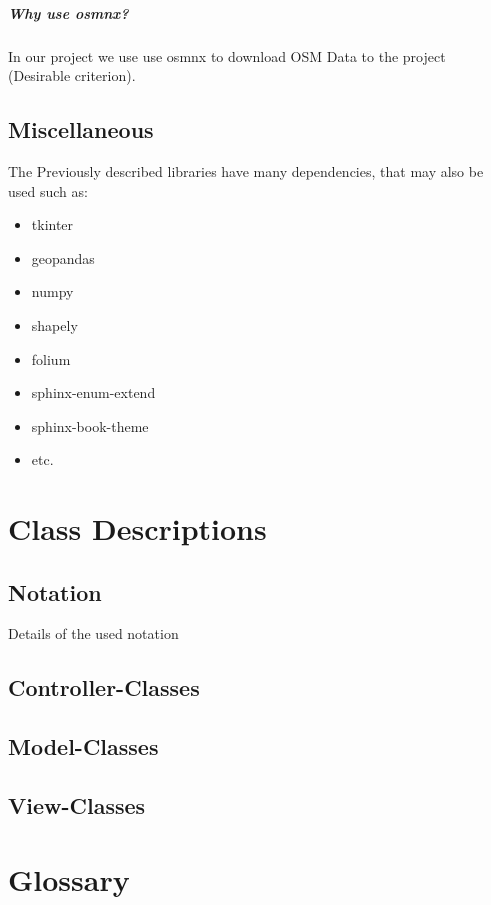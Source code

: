 \documentclass[parskip=full]{report} %
\begin{document}
\paragraph{Why use osmnx?}
In our project we use use osmnx to download OSM Data to the project (Desirable criterion).

\section{Miscellaneous}
The Previously described libraries have many dependencies, that may also be used such as:
\begin{itemize}
    \item tkinter
    \item geopandas
    \item numpy
    \item shapely
    \item folium
    \item sphinx-enum-extend
    \item sphinx-book-theme 
    \item etc.
\end{itemize}



\chapter{Class Descriptions} \label{sec::descriptions}
\section{Notation}
Details of the used notation

\section{Controller-Classes}

\section{Model-Classes}

\section{View-Classes}



\chapter{Glossary}
\end{document}

